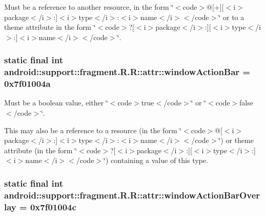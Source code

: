 Must be a reference to another resource, in the form \char`\"{}$<$code$>$@\mbox{[}+\mbox{]}\mbox{[}$<$i$>$package$<$/i$>$:\mbox{]}$<$i$>$type$<$/i$>$:$<$i$>$name$<$/i$>$$<$/code$>$\char`\"{} or to a theme attribute in the form \char`\"{}$<$code$>$?\mbox{[}$<$i$>$package$<$/i$>$:\mbox{]}\mbox{[}$<$i$>$type$<$/i$>$:\mbox{]}$<$i$>$name$<$/i$>$$<$/code$>$\char`\"{}. \hypertarget{classandroid_1_1support_1_1fragment_1_1_r_1_1attr_abf5cdc6977ff8a75e67aaa825c4f61a}{
\subsubsection[{windowActionBar}]{\setlength{\rightskip}{0pt plus 5cm}static final int android::support::fragment.R.R::attr::windowActionBar = 0x7f01004a}}
\label{classandroid_1_1support_1_1fragment_1_1_r_1_1attr_abf5cdc6977ff8a75e67aaa825c4f61a}


Must be a boolean value, either \char`\"{}$<$code$>$true$<$/code$>$\char`\"{} or \char`\"{}$<$code$>$false$<$/code$>$\char`\"{}. 

This may also be a reference to a resource (in the form \char`\"{}$<$code$>$@\mbox{[}$<$i$>$package$<$/i$>$:\mbox{]}$<$i$>$type$<$/i$>$:$<$i$>$name$<$/i$>$$<$/code$>$\char`\"{}) or theme attribute (in the form \char`\"{}$<$code$>$?\mbox{[}$<$i$>$package$<$/i$>$:\mbox{]}\mbox{[}$<$i$>$type$<$/i$>$:\mbox{]}$<$i$>$name$<$/i$>$$<$/code$>$\char`\"{}) containing a value of this type. \hypertarget{classandroid_1_1support_1_1fragment_1_1_r_1_1attr_8046d0f70ad610298b4f9b42ee87309e}{
\subsubsection[{windowActionBarOverlay}]{\setlength{\rightskip}{0pt plus 5cm}static final int android::support::fragment.R.R::attr::windowActionBarOverlay = 0x7f01004c}}
\label{classandroid_1_1support_1_1fragment_1_1_r_1_1attr_8046d0f70ad610298b4f9b42ee87309e}


